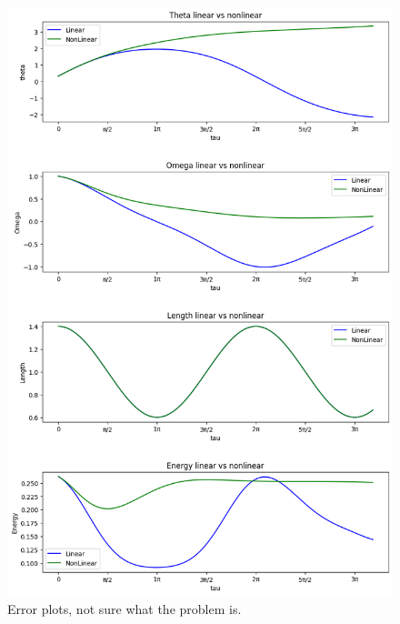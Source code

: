 \documentclass[12pt]{article}
\newcommand{\jump}{\vspace{5mm}}
\begin{document}
\begin{enumerate}[]
\begin{enumerate}[(b)]
\jump
\begin{figure}[!ht]
\centering
\includegraphics[scale = 0.6]{Images/nonlinear_vs_linear_systems_error.png}
\caption{Error plots, not sure what the problem is. }
\label{png:nonlinear_vs_linear_systems_error}
\end{figure}




\end{enumerate}
\end{enumerate}
\end{document}
